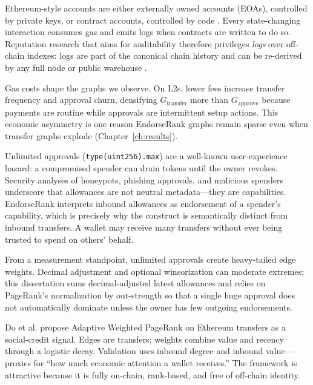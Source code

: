 Ethereum-style accounts are either externally owned accounts (EOAs), controlled by private keys, or contract accounts, controlled by code . Every state-changing interaction consumes gas and emits logs when contracts are written to do so. Reputation research that aims for auditability therefore privileges \emph{logs} over off-chain indexes: logs are part of the canonical chain history and can be re-derived by any full node or public warehouse .

Gas costs shape the graphs we observe. On L2s, lower fees increase transfer frequency and approval churn, densifying $G_{\text{transfer}}$ more than $G_{\text{approve}}$ because payments are routine while approvals are intermittent setup actions. This economic asymmetry is one reason EndorseRank graphs remain sparse even when transfer graphs explode (Chapter~\ref{ch:results}).


Unlimited approvals (\texttt{type(uint256).max}) are a well-known user-experience hazard: a compromised spender can drain tokens until the owner revokes. Security analyses of honeypots, phishing approvals, and malicious spenders  underscore that allowances are not neutral metadata---they are capabilities. EndorseRank interprets inbound allowances as endorsement of a spender's capability, which is precisely why the construct is semantically distinct from inbound transfers. A wallet may receive many transfers without ever being trusted to spend on others' behalf.

From a measurement standpoint, unlimited approvals create heavy-tailed edge weights. Decimal adjustment and optional winsorization can moderate extremes; this dissertation sums decimal-adjusted latest allowances and relies on PageRank's normalization by out-strength so that a single huge approval does not automatically dominate unless the owner has few outgoing endorsements.


Do et al. propose Adaptive Weighted PageRank on Ethereum transfers as a social-credit signal. Edges are transfers; weights combine value and recency through a logistic decay. Validation uses inbound degree and inbound value---proxies for ``how much economic attention a wallet receives.'' The framework is attractive because it is fully on-chain, rank-based, and free of off-chain identity.

